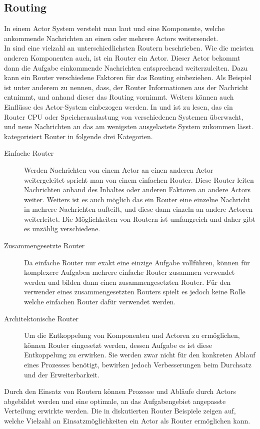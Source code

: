 \subsection{Routing}\label{sec:actor:patterns:routing}
In einem Actor System versteht man laut \cite{Vernon2015ReactiveAkka} und \cite{kuhn2017reactive} eine Komponente, welche ankommende Nachrichten an einen oder mehrere Actors weitersendet. \\
In \cite{Vernon2015ReactiveAkka} sind eine vielzahl an unterschiedlichsten Routern beschrieben. Wie die meisten anderen Komponenten auch, ist ein Router ein Actor. Dieser Actor bekommt dann die Aufgabe einkommende Nachrichten entsprechend weiterzuleiten. Dazu kann ein Router verschiedene Faktoren für das Routing einbeziehen. Als Beispiel ist unter anderem zu nennen, dass, der Router Informationen aus der Nachricht entnimmt, und anhand dieser das Routing vornimmt. Weiters können auch Einflüsse des Actor-System einbezogen werden. In \cite{Vernon2015ReactiveAkka} und \cite{Akka.netCommunityAkka.NETDocumentation} ist zu lesen, das ein Router CPU oder Speicherauslastung von verschiedenen Systemen überwacht, und neue Nachrichten an das am wenigsten ausgelastete System zukommen lässt. \\
\cite{Vernon2015ReactiveAkka} kategorisiert Router in folgende drei Kategorien. 
\begin{description}
    \item[Einfache Router] Werden Nachrichten von einem Actor an einen anderen Actor weitergeleitet spricht man von einem einfachen Router. Diese Router leiten Nachrichten anhand des Inhaltes oder anderen Faktoren an andere Actors weiter. Weiters ist es auch möglich das ein Router eine einzelne Nachricht in mehrere Nachrichten aufteilt, und diese dann einzeln an andere Actoren weiterleitet. Die Möglichkeiten von Routern ist umfangreich und daher gibt es unzählig verschiedene.
    \item[Zusammengesetzte Router] Da einfache Router nur exakt eine einzige Aufgabe vollführen, können für komplexere Aufgaben mehrere einfache Router zusammen verwendet werden und bilden dann einen zusammengesetzten Router. Für den verwender eines zusammengesetzten Routers spielt es jedoch keine Rolle welche einfachen Router dafür verwendet werden.
    \item[Architektonische Router] Um die Entkoppelung von Komponenten und Actoren zu ermöglichen, können Router eingesetzt werden, dessen Aufgabe es ist diese Entkoppelung zu erwirken. Sie werden zwar nicht für den konkreten Ablauf eines Prozesses benötigt, bewirken jedoch Verbesserungen beim Durchsatz und der Erweiterbarkeit. 
\end{description}
Durch den Einsatz von Routern können Prozesse und Abläufe durch Actors abgebildet werden und eine optimale, an das Aufgabengebiet angepasste Verteilung erwirkte werden. Die in \cite{Vernon2015ReactiveAkka} diskutierten Router Beispiele zeigen auf, welche Vielzahl an Einsatzmöglichkeiten ein Actor als Router ermöglichen kann. 

